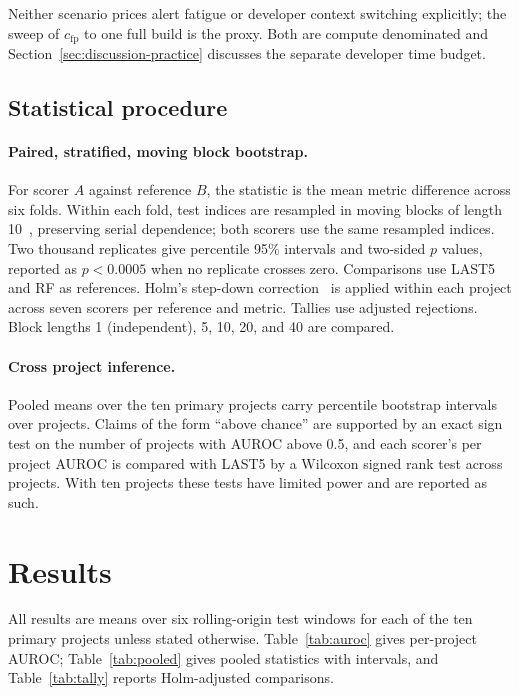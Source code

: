 \documentclass[sigconf,review,anonymous,nonacm]{acmart}
\begin{document}
Neither scenario prices alert fatigue or developer context switching explicitly; the sweep of $c_{\mathrm{fp}}$ to one full build is the proxy. Both are compute denominated and Section~\ref{sec:discussion-practice} discusses the separate developer time budget.

\subsection{Statistical procedure}
\label{sec:design-stats}

\paragraph{Paired, stratified, moving block bootstrap.} For scorer $A$ against reference $B$, the statistic is the mean metric difference across six folds. Within each fold, test indices are resampled in moving blocks of length 10~\cite{kunsch1989}, preserving serial dependence; both scorers use the same resampled indices. Two thousand replicates give percentile 95\% intervals and two-sided $p$ values, reported as $p<0.0005$ when no replicate crosses zero. Comparisons use LAST5 and RF as references. Holm's step-down correction~\cite{holm1979} is applied within each project across seven scorers per reference and metric. Tallies use adjusted rejections. Block lengths 1 (independent), 5, 10, 20, and 40 are compared.

\paragraph{Cross project inference.} Pooled means over the ten primary projects carry percentile bootstrap intervals over projects. Claims of the form ``above chance'' are supported by an exact sign test on the number of projects with AUROC above 0.5, and each scorer's per project AUROC is compared with LAST5 by a Wilcoxon signed rank test across projects. With ten projects these tests have limited power and are reported as such.

\section{Results}
\label{sec:results}

All results are means over six rolling-origin test windows for each of the ten primary projects unless stated otherwise. Table~\ref{tab:auroc} gives per-project AUROC; Table~\ref{tab:pooled} gives pooled statistics with intervals, and Table~\ref{tab:tally} reports Holm-adjusted comparisons.
\end{document}
